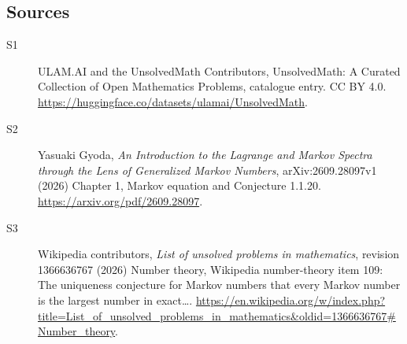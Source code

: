 \documentclass[11pt]{article}
\begin{document}
\subsection{Sources}
\begin{description}
\item[\hypertarget{source:statement:1}{S1}] ULAM.AI and the UnsolvedMath Contributors, UnsolvedMath: A Curated Collection of Open Mathematics Problems, catalogue entry. CC BY 4.0. \url{https://huggingface.co/datasets/ulamai/UnsolvedMath}.
\item[\hypertarget{source:statement:2}{S2}] Yasuaki Gyoda, \emph{An Introduction to the Lagrange and Markov Spectra through the Lens of Generalized Markov Numbers}, arXiv:2609.28097v1 (2026) Chapter 1, Markov equation and Conjecture 1.1.20. \url{https://arxiv.org/pdf/2609.28097}.
\item[\hypertarget{source:statement:3}{S3}] Wikipedia contributors, \emph{List of unsolved problems in mathematics}, revision 1366636767 (2026) Number theory, Wikipedia number-theory item 109: The uniqueness conjecture for Markov numbers that every Markov number is the largest number in exact…. \url{https://en.wikipedia.org/w/index.php?title=List_of_unsolved_problems_in_mathematics&oldid=1366636767#Number_theory}.
\end{description}
\label{end:statement}
\end{document}
